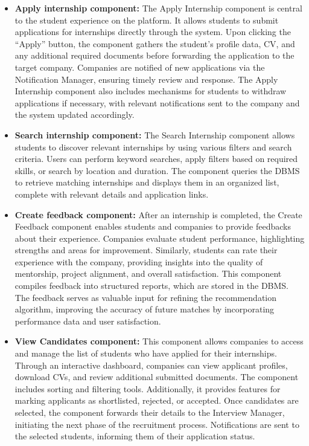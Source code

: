 \begin{itemize}
    \item \textbf{Apply internship component:} The Apply Internship component is central to the student experience on the platform. It allows students to submit applications for internships directly through the system. Upon clicking the “Apply” button, the component gathers the student’s profile data, CV, and any additional required documents before forwarding the application to the target company. Companies are notified of new applications via the Notification Manager, ensuring timely review and response. The Apply Internship component also includes mechanisms for students to withdraw applications if necessary, with relevant notifications sent to the company and the system updated accordingly.
    \item \textbf{Search internship component:} The Search Internship component allows students to discover relevant internships by using various filters and search criteria. Users can perform keyword searches, apply filters based on required skills, or search by location and duration. The component queries the DBMS to retrieve matching internships and displays them in an organized list, complete with relevant details and application links.
    \item \textbf{Create feedback component:} After an internship is completed, the Create Feedback component enables students and companies to provide feedbacks about their experience. Companies evaluate student performance, highlighting strengths and areas for improvement. Similarly, students can rate their experience with the company, providing insights into the quality of mentorship, project alignment, and overall satisfaction. This component compiles feedback into structured reports, which are stored in the DBMS. The feedback serves as valuable input for refining the recommendation algorithm, improving the accuracy of future matches by incorporating performance data and user satisfaction.
    \item \textbf{View Candidates component:} This component allows companies to access and manage the list of students who have applied for their internships. Through an interactive dashboard, companies can view applicant profiles, download CVs, and review additional submitted documents. The component includes sorting and filtering tools. Additionally, it provides features for marking applicants as shortlisted, rejected, or accepted. Once candidates are selected, the component forwards their details to the Interview Manager, initiating the next phase of the recruitment process. Notifications are sent to the selected students, informing them of their application status.
\end{itemize}

